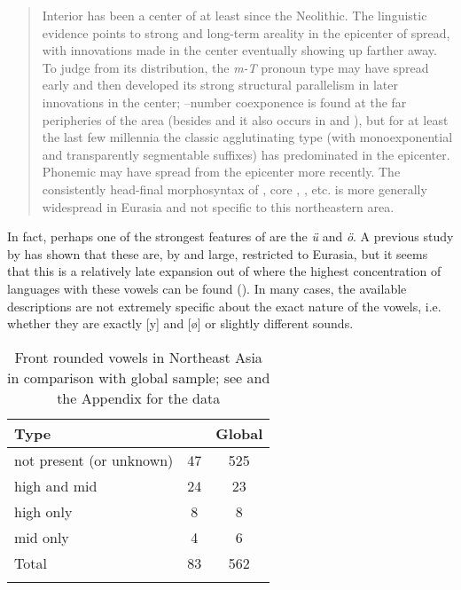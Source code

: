 \begin{quote}
Interior  has been a center of  at least since the Neolithic. The linguistic evidence points to strong and long-term areality in the epicenter of spread, with innovations made in the center eventually showing up farther away. To judge from its distribution, the \textit{m-T} pronoun type may have spread early and then developed its strong structural parallelism in later innovations in the center; –number coexponence is found at the far peripheries of the area (besides  and  it also occurs in  and ), but for at least the last few millennia the classic agglutinating type (with monoexponential and transparently segmentable suffixes) has predominated in the epicenter. Phonemic  may have spread from the epicenter more recently. The consistently head-final morphosyntax of , core , , etc. is more generally widespread in Eurasia and not specific to this northeastern area.
\end{quote}

\noindent In fact, perhaps one of the strongest features of  are the  \textit{ü} and \textit{ö}. A previous study by \citet{Maddieson2013} has shown that these are, by and large, restricted to Eurasia, but it seems that this is a relatively late expansion out of  where the highest concentration of languages with these vowels can be found (). In many cases, the available descriptions are not extremely specific about the exact nature of the vowels, i.e. whether they are exactly [y] and [ø] or slightly different sounds.

\begin{table}
\caption{Front rounded vowels in Northeast Asia in comparison with  global sample; see  and the Appendix for the data}
\label{tab:3:3}

\begin{tabularx}{\textwidth}{QSS}
\lsptoprule

\textbf{Type} & \textbf{} & \textbf{Global}\\
\midrule
not present (or unknown) & 47 & 525\\
high and mid & 24 & 23\\
high only & 8 & 8\\
mid only & 4 & 6\\
\midrule
Total & 83 & 562\\
\lspbottomrule
\end{tabularx}
\end{table}


